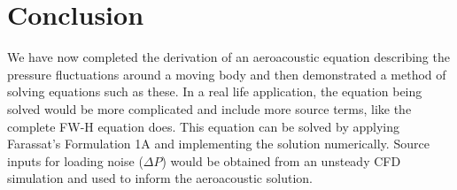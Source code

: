 \documentclass[]{aiaa-tc}%
\begin{document}
\section*{Conclusion}

We have now completed the derivation of an aeroacoustic equation describing the pressure fluctuations around a moving body and then demonstrated a method of solving equations such as these.  In a real life application, the equation being solved would be more complicated and include more source terms, like the complete FW-H equation does.  This equation can be solved by applying Farassat's Formulation 1A and implementing the solution numerically.  Source inputs for loading noise ($\Delta P$) would be obtained from an unsteady CFD simulation and used to inform the aeroacoustic solution.
\end{document}
